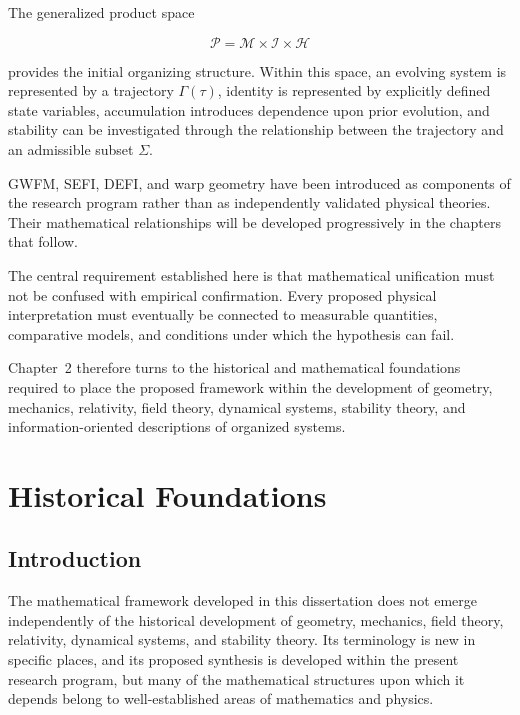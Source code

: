 \documentclass[12pt,oneside]{book}
\begin{document}
The generalized product space

\begin{equation}
    \mathcal{P}
    =
    \mathcal{M}
    \times
    \mathcal{I}
    \times
    \mathcal{H}
\end{equation}

provides the initial organizing structure. Within this space,
an evolving system is represented by a trajectory
\(\Gamma(\tau)\), identity is represented by explicitly defined
state variables, accumulation introduces dependence upon prior
evolution, and stability can be investigated through the
relationship between the trajectory and an admissible subset
\(\Sigma\).

GWFM, SEFI, DEFI, and warp geometry have been introduced as
components of the research program rather than as independently
validated physical theories. Their mathematical relationships
will be developed progressively in the chapters that follow.

The central requirement established here is that mathematical
unification must not be confused with empirical confirmation.
Every proposed physical interpretation must eventually be
connected to measurable quantities, comparative models, and
conditions under which the hypothesis can fail.

Chapter~2 therefore turns to the historical and mathematical
foundations required to place the proposed framework within the
development of geometry, mechanics, relativity, field theory,
dynamical systems, stability theory, and information-oriented
descriptions of organized systems.

\chapter{Historical Foundations}
\label{chap:historical-foundations}


\section{Introduction}
\label{sec:historical-introduction}

The mathematical framework developed in this dissertation does
not emerge independently of the historical development of
geometry, mechanics, field theory, relativity, dynamical
systems, and stability theory. Its terminology is new in
specific places, and its proposed synthesis is developed within
the present research program, but many of the mathematical
structures upon which it depends belong to well-established
areas of mathematics and physics.
\end{document}
